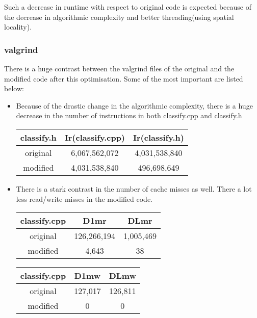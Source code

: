 \documentclass{article}
\begin{document}
    Such a decrease in runtime with respect to original code is expected because of the decrease in algorithmic complexity and better threading(using spatial locality).

    \subsubsection{valgrind}
    There is a huge contrast between the valgrind files of the original and the modified code after this optimisation. Some of the most important are listed below: 
    
    \begin{itemize}
        \item Because of the drastic change in the algorithmic complexity, there is a huge decrease in the number of instructions in both classify.cpp and classify.h
        
        \begin{center}
            \begin{tabular}{|c|c|c|}
                \hline
                \textbf{classify.h} & \textbf{Ir(classify.cpp)} & \textbf{Ir(classify.h)} \\
                \hline
                original & 6,067,562,072 & 4,031,538,840 \\
                \hline
                modified & 4,031,538,840 & 496,698,649 \\
                \hline
            \end{tabular}
        \end{center}
        
        \item There is a stark contrast in the number of cache misses as well. There a lot less read/write misses in the modified code. 
        
        \begin{center}
            \begin{tabular}{|c|c|c|}
                \hline
                \textbf{classify.cpp} & \textbf{D1mr} & \textbf{DLmr} \\
                \hline
                original & 126,266,194 & 1,005,469 \\
                \hline
                modified & 4,643 & 38 \\
                \hline
            \end{tabular}
        \end{center}
        
        \begin{center}
            \begin{tabular}{|c|c|c|}
                \hline
                \textbf{classify.cpp} & \textbf{D1mw} & \textbf{DLmw} \\
                \hline
                original & 127,017 & 126,811 \\
                \hline
                modified & 0 & 0 \\
                \hline
            \end{tabular}
        \end{center}
        

\end{itemize}
\end{document}
